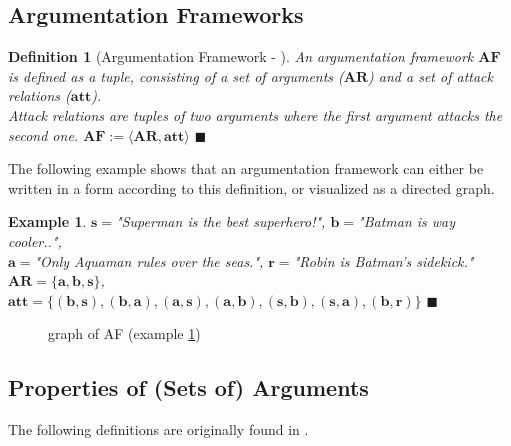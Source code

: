 \documentclass[12pt]{report}
\numberwithin{figure}{chapter}
\theoremstyle{break}
\newtheorem{defn}{Definition}[chapter]
\newtheorem{exmpl}{Example}[chapter]
\newenvironment{mydefn}{\begin{defn}}{$\blacksquare$ \end{defn}}
\newenvironment{myexmpl}{\begin{exmpl}}{$\blacksquare$ \end{exmpl}}
\begin{document}
\subsection{Argumentation Frameworks}
\begin{mydefn}[Argumentation Framework - \cite{Dung}]
An argumentation framework $\bm{AF}$ is defined as a tuple, consisting of a set of arguments ($\bm{AR}$) and a 
set of attack relations ($\bm{att}$).\\
Attack relations are tuples of two arguments where the first argument attacks the second one.
$\bm{AF:=\langle AR,att \rangle}$
\end{mydefn}

The following example shows that an argumentation framework can either be written in a form according to this definition, or visualized as a directed graph.

\newpage

\begin{myexmpl}
$\bm{s=}$"Superman is the best superhero!", $\bm{b=}$"Batman is way cooler..",\\$\bm{a=}$"Only Aquaman rules over the seas.", $\bm{r=}$"Robin is Batman's sidekick."\\
$\bm{AR = \{a,b,s\}}$, $\bm{att=\{(b,s),(b,a),(a,s),(a,b),(s,b),(s,a),(b,r)\}}$
\label{a b s r}
\end{myexmpl}

\begin{figure}[h!]
\begin{center}\end{center}
\caption{graph of AF (example \ref{a b s r})}
\end{figure}

\subsection{Properties of (Sets of) Arguments}

The following definitions are originally found in \cite{Dung}.
\end{document}
